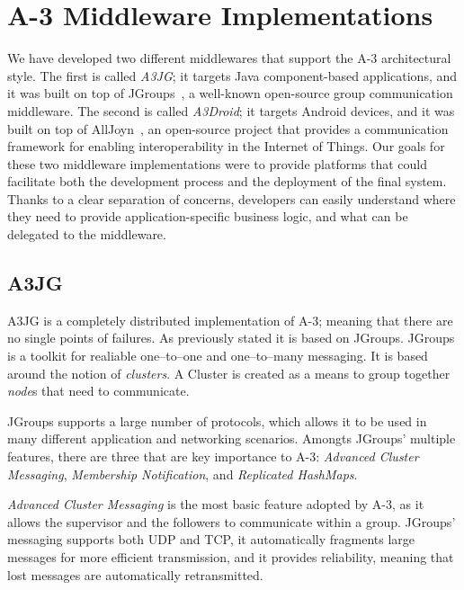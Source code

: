 
\section{A-3 Middleware Implementations}
\label{sec:implementation}

We have developed two different middlewares that support the A-3 architectural style. The first is called \emph{A3JG}; it targets Java component-based applications, and it was built on top of JGroups~\cite{JGroups}, a well-known open-source group communication middleware. The second is called \emph{A3Droid}; it targets Android devices, and it was built on top of AllJoyn~\cite{AllJoyn}, an open-source project that provides a communication framework for enabling interoperability in the Internet of Things. Our goals for these two middleware implementations were to provide platforms that could facilitate both the development process and the deployment of the final system. Thanks to a clear separation of concerns, developers can easily understand where they need to provide application-specific business logic, and what can be delegated to the middleware. 



\subsection{A3JG} %
\label{sub:a3jg}

A3JG is a completely distributed implementation of A-3; meaning that there are no single points of failures. As previously stated it is based on JGroups. JGroups is a toolkit for realiable one--to--one and one--to--many messaging. It is based around the notion of \emph{clusters}. A Cluster is created as a means to group together \emph{node}s that need to communicate. 

JGroups supports a large number of protocols, which allows it to be used in many different application and networking scenarios. Amongts JGroups' multiple features, there are three that are key importance to A-3: \emph{Advanced Cluster Messaging}, \emph{Membership Notification}, and \emph{Replicated HashMaps}.

\emph{Advanced Cluster Messaging} is the most basic feature adopted by A-3, as it allows the supervisor and the followers to communicate within a group. JGroups' messaging supports both UDP and TCP, it automatically fragments large messages for more efficient transmission, and it provides reliability, meaning that lost messages are automatically retransmitted. 

